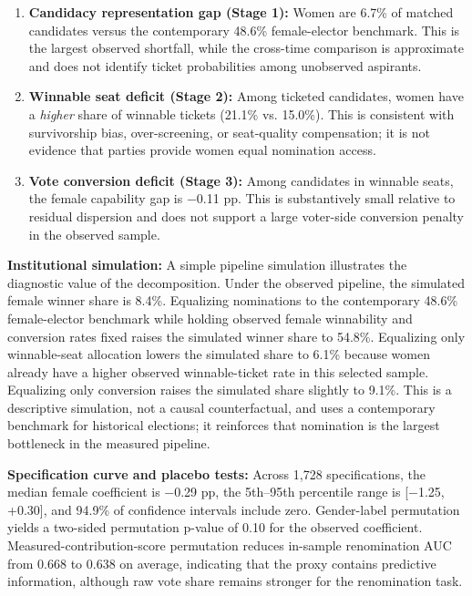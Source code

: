 \documentclass[
]{article}
\begin{document}
\begin{enumerate}
\def\labelenumi{\arabic{enumi}.}
\item
  \textbf{Candidacy representation gap (Stage 1):} Women are 6.7\% of matched candidates versus the contemporary 48.6\% female-elector benchmark. This is the largest observed shortfall, while the cross-time comparison is approximate and does not identify ticket probabilities among unobserved aspirants.
\item
  \textbf{Winnable seat deficit (Stage 2):} Among ticketed candidates, women have a \emph{higher} share of winnable tickets (21.1\% vs. 15.0\%). This is consistent with survivorship bias, over-screening, or seat-quality compensation; it is not evidence that parties provide women equal nomination access.
\item
  \textbf{Vote conversion deficit (Stage 3):} Among candidates in winnable seats, the female capability gap is $-$0.11 pp. This is substantively small relative to residual dispersion and does not support a large voter-side conversion penalty in the observed sample.
\end{enumerate}

\textbf{Institutional simulation:} A simple pipeline simulation illustrates the diagnostic value of the decomposition. Under the observed pipeline, the simulated female winner share is 8.4\%. Equalizing nominations to the contemporary 48.6\% female-elector benchmark while holding observed female winnability and conversion rates fixed raises the simulated winner share to 54.8\%. Equalizing only winnable-seat allocation lowers the simulated share to 6.1\% because women already have a higher observed winnable-ticket rate in this selected sample. Equalizing only conversion raises the simulated share slightly to 9.1\%. This is a descriptive simulation, not a causal counterfactual, and uses a contemporary benchmark for historical elections; it reinforces that nomination is the largest bottleneck in the measured pipeline.

\textbf{Specification curve and placebo tests:} Across 1,728 specifications, the median female coefficient is $-$0.29 pp, the 5th--95th percentile range is {[}$-$1.25, +0.30{]}, and 94.9\% of confidence intervals include zero. Gender-label permutation yields a two-sided permutation p-value of 0.10 for the observed coefficient. Measured-contribution-score permutation reduces in-sample renomination AUC from 0.668 to 0.638 on average, indicating that the proxy contains predictive information, although raw vote share remains stronger for the renomination task.
\end{document}
